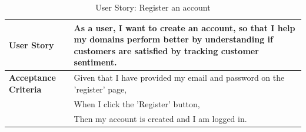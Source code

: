 \documentclass[12pt]{article}
\begin{document}
\begin{table}[htbp]
  \caption{User Story: Register an account}
  \begin{tabular}{|p{}|p{}|}
    \hline
    \textbf{User Story}          & As a user, I want to create an account, so that I help my domains perform better by understanding if customers are satisfied by tracking customer sentiment. \\
    \hline
    \textbf{Acceptance Criteria} &
    Given that I have provided my email and password on the 'register' page,                                                                                                                    \\
                                 & When I click the 'Register' button,                                                                                                                          \\
                                 & Then my account is created and I am logged in.                                                                                                               \\
    \hline
  \end{tabular}
\end{table}
\end{document}

